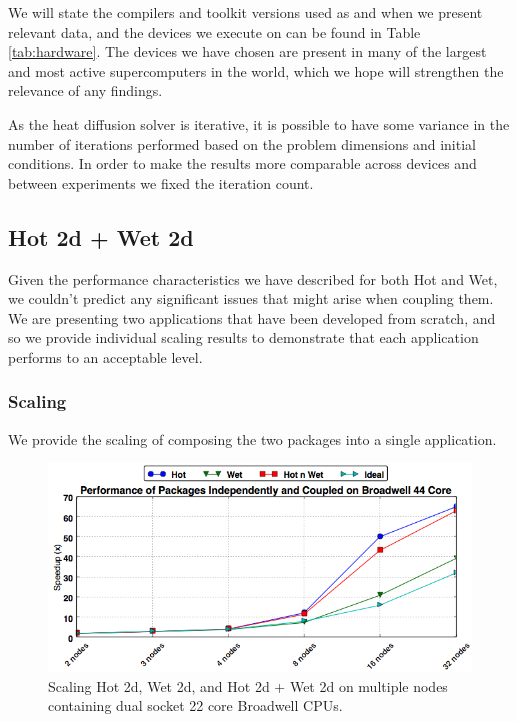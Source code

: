 \documentclass[runningheads,a4paper]{llncs}
\begin{document}
We will state the compilers and toolkit versions used as and when we present relevant data, and the devices we execute on can be found in Table \ref{tab:hardware}. The devices we have chosen are present in many of the largest and most active supercomputers in the world, which we hope will strengthen the relevance of any findings.

As the heat diffusion solver is iterative, it is possible to have some variance in the number of iterations performed based on the problem dimensions and initial conditions. In order to make the results more comparable across devices and between experiments we fixed the iteration count.

\subsection{Hot 2d + Wet 2d}

Given the performance characteristics we have described for both Hot and Wet, we couldn't predict any significant issues that might arise when coupling them. We are presenting two applications that have been developed from scratch, and so we provide individual scaling results to demonstrate that each application performs to an acceptable level. 

\subsubsection{Scaling}

We provide the scaling of composing the two packages into a single application.

\begin{figure}
  \centering
  \includegraphics[width=1.0\linewidth]{cpu_results}
  \caption{Scaling Hot 2d, Wet 2d, and Hot 2d + Wet 2d on multiple nodes containing dual socket 22 core Broadwell CPUs.}
  \label{fig:scaling-hot-wet-broadwell}
\end{figure}
\end{document}
